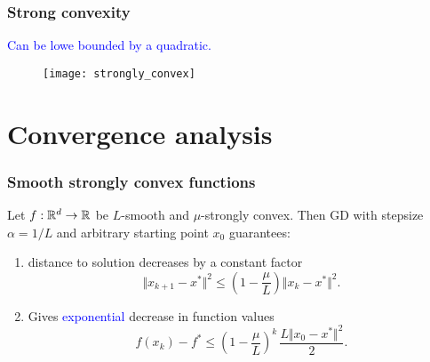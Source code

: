 \documentclass{beamer}
\begin{document}
\begin{frame}
  \frametitle{Strong convexity}
  \begin{center}
    \textcolor{blue}{Can be lowe bounded by a quadratic.}
  \end{center}
  \begin{figure}[ht]
    \centering
    \texttt{[image: strongly\_convex]}
  \end{figure}

\end{frame}

\section{Convergence analysis}%
\label{sec:}

\begin{frame}
  \frametitle{Smooth strongly convex functions}

  \begin{theorem}
    Let $f:\mathbb{R}^d \to \mathbb{R}$ be $L$-smooth and $\mu$-strongly convex. Then GD with stepsize $\alpha=1/L$ and arbitrary starting point $x_0$ guarantees:
    \begin{enumerate}
      \item distance to solution decreases by a constant factor
            \begin{equation}
              \Vert x_{k+1}-x^* \Vert^2 \le \left(1-\frac{\mu}{L}\right) \Vert x_k -x^* \Vert^2.
            \end{equation}
      \item Gives \textcolor{blue}{exponential} decrease in function values
            \begin{equation}
              f(x_k)-f^* \le {\left(1-\frac{\mu}{L}\right)}^k \, \frac{L \Vert x_0 -x^* \Vert^2}{2}.
            \end{equation}
    \end{enumerate}
  \end{theorem}

\end{frame}
\end{document}
